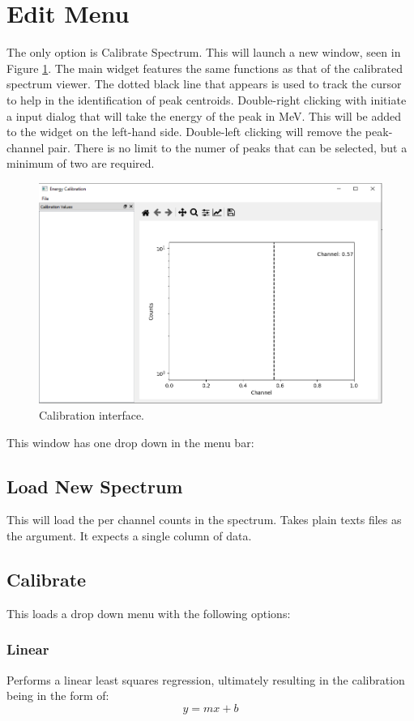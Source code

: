 \section{Edit Menu}
The only option is Calibrate Spectrum. This will launch a new window, seen in Figure \ref{fig:calibrate_window}. The main widget features the same functions as that of the calibrated spectrum viewer. The dotted black line that appears is used to track the cursor to help in the identification of peak centroids. Double-right clicking with initiate a input dialog that will take the energy of the peak in MeV. This will be added to the widget on the left-hand side. Double-left clicking will remove the peak-channel pair. There is no limit to the numer of peaks that can be selected, but a minimum of two are required. \\
\begin{figure}[h!]
	\centering
	\includegraphics[width=\linewidth]{Calibrate.png}
	\caption{Calibration interface.}
	\label{fig:calibrate_window}
\end{figure}

This window has one drop down in the menu bar:
	\subsection{Load New Spectrum}
		This will load the per channel counts in the spectrum. Takes plain texts files as the argument. It expects a single column of data.

	\subsection{Calibrate}
		This loads a drop down menu with the following options:
				\subsubsection{Linear}
				Performs a linear least squares regression, ultimately resulting in the calibration being in the form of:
				\begin{equation}
				 	y=mx+b
				\label{eq:linear}
				\end{equation}

